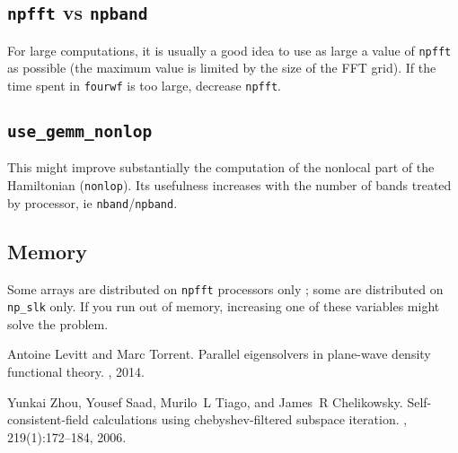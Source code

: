 \documentclass[11pt]{article}
\begin{document}
\subsection{\texttt{npfft} vs \texttt{npband}}
For large computations, it is usually a good idea to use as large a
value of \texttt{npfft} as possible (the maximum value is limited by
the size of the FFT grid). If the time spent in \texttt{fourwf} is too
large, decrease \texttt{npfft}.
\subsection{\texttt{use\_gemm\_nonlop}}
This might improve substantially the computation of the nonlocal part
of the Hamiltonian (\texttt{nonlop}). Its usefulness increases with
the number of bands treated by processor, ie
\texttt{nband}/\texttt{npband}.
\subsection{Memory}
Some arrays are distributed on \texttt{npfft} processors only ; some
are distributed on \texttt{np\_slk} only. If you run out of memory,
increasing one of these variables might solve the problem.

\begin{thebibliography}{ZSTC06}

Antoine Levitt and Marc Torrent.
\newblock Parallel eigensolvers in plane-wave density functional theory.
, 2014.

Yunkai Zhou, Yousef Saad, Murilo~L Tiago, and James~R Chelikowsky.
\newblock Self-consistent-field calculations using chebyshev-filtered subspace
  iteration.
, 219(1):172--184, 2006.

\end{thebibliography}
% 
% 
\end{document}
